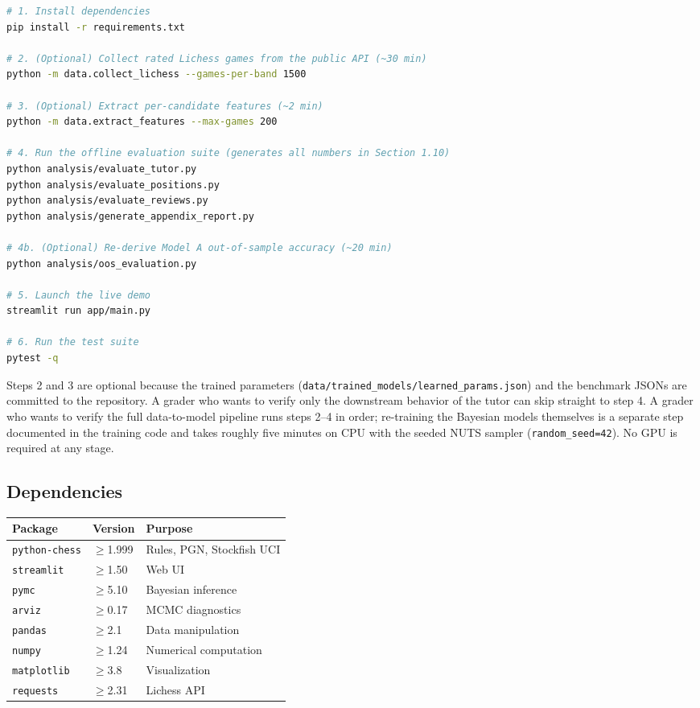 \documentclass[11pt]{article}
\begin{document}
\begin{lstlisting}[language=bash]
# 1. Install dependencies
pip install -r requirements.txt

# 2. (Optional) Collect rated Lichess games from the public API (~30 min)
python -m data.collect_lichess --games-per-band 1500

# 3. (Optional) Extract per-candidate features (~2 min)
python -m data.extract_features --max-games 200

# 4. Run the offline evaluation suite (generates all numbers in Section 1.10)
python analysis/evaluate_tutor.py
python analysis/evaluate_positions.py
python analysis/evaluate_reviews.py
python analysis/generate_appendix_report.py

# 4b. (Optional) Re-derive Model A out-of-sample accuracy (~20 min)
python analysis/oos_evaluation.py

# 5. Launch the live demo
streamlit run app/main.py

# 6. Run the test suite
pytest -q
\end{lstlisting}

Steps 2 and 3 are optional because the trained parameters (\texttt{data/trained\_models/learned\_params.json}) and the benchmark JSONs are committed to the repository. A grader who wants to verify only the downstream behavior of the tutor can skip straight to step 4. A grader who wants to verify the full data-to-model pipeline runs steps 2--4 in order; re-training the Bayesian models themselves is a separate step documented in the training code and takes roughly five minutes on CPU with the seeded NUTS sampler (\texttt{random\_seed=42}). No GPU is required at any stage.

\subsection{Dependencies}
\begin{center}
\begin{tabular}{@{}lll@{}}
\toprule
Package & Version & Purpose \\
\midrule
\texttt{python-chess} & $\geq$1.999 & Rules, PGN, Stockfish UCI \\
\texttt{streamlit}    & $\geq$1.50 & Web UI \\
\texttt{pymc}         & $\geq$5.10 & Bayesian inference \\
\texttt{arviz}        & $\geq$0.17 & MCMC diagnostics \\
\texttt{pandas}       & $\geq$2.1  & Data manipulation \\
\texttt{numpy}        & $\geq$1.24 & Numerical computation \\
\texttt{matplotlib}   & $\geq$3.8  & Visualization \\
\texttt{requests}     & $\geq$2.31 & Lichess API \\
\bottomrule
\end{tabular}
\end{center}
\end{document}
